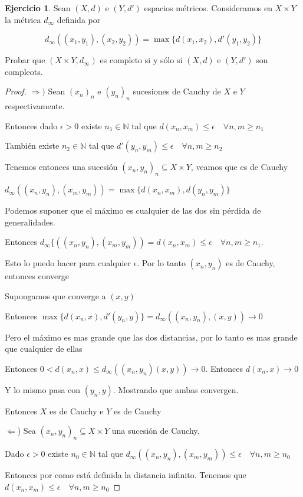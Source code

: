 \documentclass[11pt]{report}
\newcommand{\N}{\mathbb{N}}
\newcommand{\Ra}{\Rightarrow}
\newcommand{\ra}{\rightarrow}
\theoremstyle{definition}
\newtheorem{ej}{Ejercicio}
\begin{document}
	\begin{ej}
		Sean $(X,d)$ e $(Y,d')$ espacios métricos. Consideramos en $X \times Y$ la métrica $d_{\infty}$ definida por

		$$ d_{\infty}((x_1,y_1),(x_2,y_2)) = \max\{d(x_1,x_2),d'(y_1,y_2)\}$$

		Probar que $(X\times Y, d_{\infty})$ es completo si y sólo si $(X,d)$ e $(Y,d')$ son compleots.
		\begin{proof}
			$\Ra )$ Sean $(x_n)_n$ e $(y_n)_n$ sucesiones de Cauchy de $X$ e $Y$ respectivamente.

			Entonces dado $\epsilon >0$ existe $n_1 \in \N$ tal que $d(x_n,x_m) \leq \epsilon \quad \forall n,m \geq n_1$ 

			También existe $n_2 \in \N $ tal que $d'(y_n,y_m) \leq \epsilon \quad \forall n,m \geq n_2$

			Tenemos entonces una sucesión $(x_n,y_n)_n \subseteq X \times Y$, veamos que es de Cauchy

			$d_{\infty}((x_n,y_n),(x_m,y_m)) = \max \{d(x_n,x_m),d(y_n,y_m)\}$

			Podemos suponer que el máximo es cualquier de las dos sin pérdida de generalidades.

			Entonces $d_{\infty}\{((x_n,y_n),(x_m,y_m)) = d(x_n,x_m) \leq \epsilon \quad \forall n,m \geq n_1$. 

			Esto lo puedo hacer para cualquier $\epsilon$. Por lo tanto $(x_n,y_n)$ es de Cauchy, entonces converge

			Supongamos que converge a $(x,y)$ 

			Entonces $ \max \{d(x_n,x),d'(y_n,y)\} = d_{\infty}((x_n,y_n),(x,y)) \ra 0$

			Pero el máximo es mas grande que las dos distancias, por lo tanto es mas grande que cualquier de ellas 

			Entonces $ 0 < d(x_n,x) \leq d_{\infty}((x_n,y_n)(x,y)) \ra 0$. Entonces $d(x_n,x) \ra 0$ 

			Y lo mismo pasa con $(y_n,y)$. Mostrando que ambas convergen. 

			Entonces $X$ es de Cauchy e $Y$ es de Cauchy

			$\Leftarrow$) Sea $(x_n,y_n)_n \subseteq X\times Y$ una sucesión de Cauchy.

			Dado $\epsilon > 0$ existe $n_0 \in \N$ tal que $d_{\infty}((x_n,y_n),(x_m,y_m)) \leq \epsilon \quad \forall n,m\geq n_0$ 
			
			Entonces por como está  definida la distancia infinito. Tenemos que $d(x_n,x_m) \leq \epsilon \quad \forall n,m \geq n_0$


\end{proof}
\end{ej}
\end{document}
